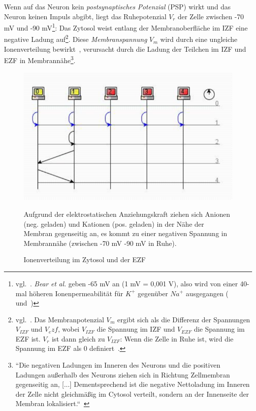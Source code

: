 {Wenn auf das Neuron kein \textit{postsynaptisches Potenzial} (PSP) wirkt und das Neuron keinen Impuls abgibt, liegt das Ruhepotenzial $V_r$ der Zelle zwischen -70 mV und -90 mV\footnote{
   vgl.~\cite[47, Tafel 2.3 (A.1)]{SD07}. \textit{Bear et al.} geben -65 mV an (1 mV = 0,001 V), also wird von einer 40-mal höheren Ionenpermeabilität für $K^+$ gegenüber $Na^+$ ausgegangen (~\cite[74, Exkurs 3.2]{BCP18} und~\cite[70]{BCP18})
}: Das Zytosol weist entlang der Membranoberfläche im IZF eine negative Ladung auf\footnote{
 vgl.~\cite[61]{BCP18}. Das Membranpotenzial $V_m$ ergibt sich als die Differenz der Spannungen $V_{IZF}$ und $V_ezf$, wobei $V_{IZF}$ die Spannung im IZF und $V_{EZF}$ die Spannung im EZF ist. $V_r$ ist dann gleich zu $V_{IZF}$: Wenn die Zelle in Ruhe ist, wird die Spannung im EZF als $0$ definiert~\cite[127]{KSJ+13}.
}.
Diese \textit{Membranspannung} $V_m$ wird durch eine ungleiche Ionenverteilung bewirkt~\cite[66]{FE19}, verursacht durch die Ladung der Teilchen im IZF und EZF in Membrannähe\footnote{
 ``Die negativen Ladungen im Inneren des Neurons und die positiven Ladungen außerhalb des Neurons ziehen sich in Richtung Zellmembran gegenseitig an, {[...]} Dementsprechend ist die negative Nettoladung im Inneren der Zelle nicht gleichmäßig im Cytosol verteilt, sondern an der Innenseite der Membran lokalisiert.``~\cite[72, Punkt 2]{BCP18}
}.


\begin{figure}[h]
 \centering
 \includegraphics{images/p1ReadSeq.pdf}
 \caption{Ionenverteilung im Zytosol und der EZF}
 \small
 Aufgrund der elektrostatischen Anziehungskraft ziehen sich Anionen (neg. geladen) und Kationen (pos. geladen) in der Nähe der Membran gegenseitig an, es kommt zu einer negativen Spannung in Membrannähe (zwischen -70 mV -90 mV in Ruhe).
\end{figure}

}
